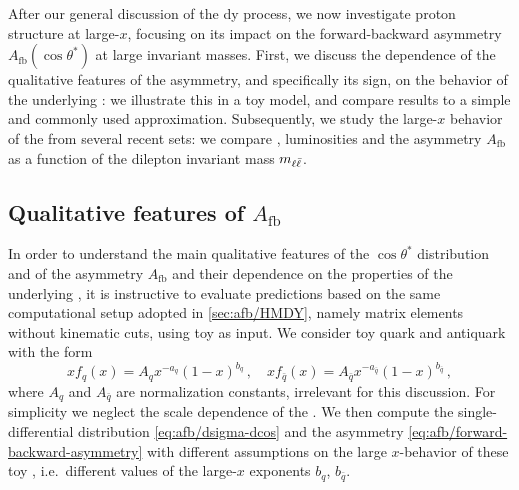
After our general discussion of the \acrlong{dy} process, we now investigate
proton structure at large-$x$, focusing on its impact on the forward-backward
asymmetry $A_{\text{fb}}\left( \cos\theta^*\right)$ at large invariant masses.
%
First, we discuss the dependence of the qualitative features of the asymmetry,
and specifically its sign, on the behavior of the underlying \pdfs: we
illustrate this in a toy model, and compare results to a simple and  commonly
used approximation.
%
Subsequently, we study the large-$x$ behavior of the \pdfs from several recent
\pdf sets: we compare \pdfs, luminosities and the \lo asymmetry $A_{\text{fb}}$
as a function of the dilepton invariant mass $m_{\ell\bar{\ell}}$.

\subsection{Qualitative features of \texorpdfstring{$A_{\text{fb}}$}{Afb}}
\label{sec:afb/afb_toy}

In order to understand the main qualitative features of  the $\cos\theta^*$
distribution and of the asymmetry $A_{\text{fb}}$ and their dependence on the 
properties of the underlying \pdfs, it is instructive to evaluate predictions
based on the same computational setup adopted in \cref{sec:afb/HMDY}, namely
\lo matrix elements without kinematic cuts, using toy \pdfs as input.
%
We consider toy quark and antiquark \pdf with the form
\begin{equation}
  \label{eq:afb/toypdf}
  xf_q(x) = A_qx^{-a_q}(1-x)^{b_q} \, , \quad xf_{\bar{q}}(x) = A_{\bar{q}}x^{-a_{\bar{q}}}(1-x)^{b_{\bar{q}}} \, ,
\end{equation}
where $A_q$ and $A_{\bar{q}}$ are  normalization constants, irrelevant for this
discussion.
%
For simplicity we neglect the scale dependence of the \pdfs.
%
We then compute the single-differential distribution \cref{eq:afb/dsigma-dcos}
and the asymmetry \cref{eq:afb/forward-backward-asymmetry} with different
assumptions on the large $x$-behavior of these toy \pdfs, i.e.\ different
values of the large-$x$ exponents $b_q$, $b_{\bar{q}}$.

